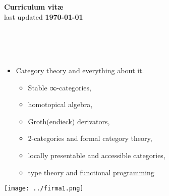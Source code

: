 \documentclass[10pt,a4paper]{article}
\begin{document}
\begin{center}
   \colorbox{gray!40}{\titlefont\Large\bf Curriculum vit\ae} \\[2mm]
   last updated {\bf \today}
\end{center}

\begin{flushright}
   \begin{minipage}{0.3\textwidth}
      \\[1em] %
      \\[-.2em] %
      \\[.5em] %
      \newline
      \newline %
   \end{minipage}
\end{flushright}

\begin{itemize}
   \item[] Category theory and everything about it.
   \begin{itemize}
      \item Stable ∞-categories,
      \item homotopical algebra,
      \item Groth(endieck) derivators,
      \item 2-categories and formal category theory,
      \item locally presentable and accessible categories,
      \item type theory and functional programming
   \end{itemize} 
\end{itemize}
\vspace{\fill}\noindent%




\newpage











\vspace{\fill}
\begin{flushright}
\texttt{[image: ../firma1.png]}
\end{flushright}
\end{document}
